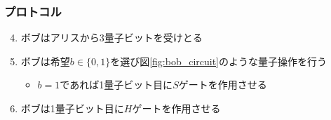 \begin{frame}
  \frametitle{プロトコル}

  \begin{enumerate}
    \setcounter{enumi}{3}

    \item<+-> ボブはアリスから3量子ビットを受けとる
    
    \item<+-> ボブは希望$b \in \{0, 1\}$を選び図\ref{fig:bob_circuit}のような量子操作を行う
    \begin{itemize}
      \item $b = 1$であれば1量子ビット目に$S$ゲートを作用させる
    \end{itemize}
    \label{enum:bob_s_gate}

    \item<+-> ボブは1量子ビット目に$H$ゲートを作用させる
    \label{enum:bob_h_gate}
  \end{enumerate}

\end{frame}

